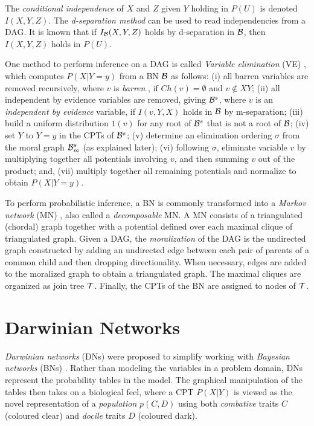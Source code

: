 The \emph{conditional independence} \cite{pear88} of $X$ and $Z$ given $Y$ holding in $P(U)$ is denoted $I(X,Y,Z)$.
The \emph{d-separation method} \cite{pear88} can be used to read independencies from a DAG.
It is known that if $I_{\cal{B}}(X,Y,Z)$ holds by d-separation in ${\cal B}$, then $I(X,Y,Z)$ holds in $P(U)$.

One method to perform inference on a DAG is called \emph{Variable elimination} (VE) \cite{zhan94}, which computes $P(X|Y=y)$ from a BN $\cal{B}$ as follows:
(i) all barren variables are removed recursively, where $v$ is \emph{barren} \cite{zhan94}, if $Ch(v) = \emptyset$ and $v \not\in XY$;
(ii) all independent by evidence variables are removed, giving ${\cal{B}}^s$, where $v$ is an \emph{independent by evidence} variable, if $I(v,Y,X)$ holds in $\cal{B}$ by m-separation;
(iii) build a uniform distribution $1(v)$ for any root of ${\cal{B}}^s$ that is not a root of $\cal{B}$;
(iv) set $Y$ to $Y=y$ in the CPTs of ${\cal{B}}^s$;
(v) determine an elimination ordering $\sigma$ from the moral graph ${\cal{B}}^{s}_{m}$ (as explained later);
(vi) following $\sigma$, eliminate variable $v$ by multiplying together all potentials involving $v$, and then summing $v$ out of the product;
and, (vii) multiply together all remaining potentials and normalize to obtain $P(X|Y=y)$.


To perform probabilistic inference, a BN is commonly transformed into a \emph{Markov network} (MN) \cite{pear88}, also called a \emph{decomposable} MN. 
A MN consists of a triangulated (chordal) graph together with a potential defined over each maximal clique of triangulated graph. 
Given a DAG, the \emph{moralization} \cite{laur88} of the DAG is the undirected graph constructed by adding an undirected edge between each pair of parents of a common child and then dropping directionality.
When necessary, edges are added to the moralized graph to obtain a triangulated graph. 
The maximal cliques are organized as join tree $\cal T$. 
Finally, the CPTs of the BN are assigned to nodes of $\cal T$. 



\section{Darwinian Networks}
\label{sec:darwinian_networks}

\emph{Darwinian networks} (DNs) \cite{butzOliveiraSantosCai15} were proposed to simplify working with \emph{Bayesian networks} (BNs) \cite{pear88}.
Rather than modeling the variables in a problem domain, DNs represent the probability tables in the model.
The graphical manipulation of the tables then takes on a biological feel, where a CPT $P(X|Y)$ is viewed as the novel representation of a \emph{population} $p(C,D)$ using both \emph{combative} traits $C$ (coloured clear) and \emph{docile} traits $D$ (coloured dark).

